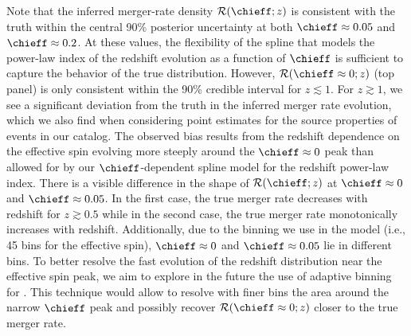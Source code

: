 \begin{refsection}
\begin{subappendices}
Note that the inferred merger-rate density $\mathcal{R}(\chieff; z)$ is consistent with the truth within the central 90\% posterior uncertainty at both $\chieff\approx0.05$ and $\chieff\approx0.2$. At these values, the flexibility of the spline that models the power-law index of the redshift evolution as a function of $\chieff$ is sufficient to capture the behavior of the true distribution. However, $\mathcal{R}(\chieff\approx0; z)$ (top panel) is only consistent within the 90\% credible interval for $z \lesssim 1$. For $z \gtrsim 1$, we see a significant deviation from the truth in the inferred merger rate evolution, which we also find when considering point estimates for the source properties of events in our catalog. The observed bias results from the redshift dependence on the effective spin evolving more steeply around the $\chieff\approx0$ peak than allowed for by our $\chieff$-dependent spline model for the redshift power-law index. There is a visible difference in the shape of $\mathcal{R}(\chieff;z)$ at $\chieff\approx0$ and $\chieff\approx0.05$. In the first case, the true merger rate decreases with redshift for $z\gtrsim 0.5$ while in the second case, the true merger rate monotonically increases with redshift. Additionally, due to the binning we use in the \Hybrid model (i.e., 45 bins for the effective spin), $\chieff\approx0$ and $\chieff\approx0.05$ lie in different bins. To better resolve the fast evolution of the redshift distribution near the effective spin peak, we aim to explore in the future the use of adaptive binning for \PixelPop. This technique would allow to resolve with finer bins the area around the narrow $\chieff$ peak and possibly recover $\mathcal{R}(\chieff\approx0; z)$ closer to the true merger rate.

\end{subappendices}

\printbibliography[heading=subbibliography]
\end{refsection}


